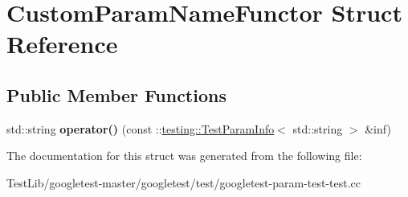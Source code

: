 \hypertarget{structCustomParamNameFunctor}{}\section{Custom\+Param\+Name\+Functor Struct Reference}
\label{structCustomParamNameFunctor}
\subsection*{Public Member Functions}
\begin{DoxyCompactItemize}
\item 
\mbox{\label{structCustomParamNameFunctor_a364d073efd6cb9a05e9d1c97565288ef}} 
std\+::string {\bfseries operator()} (const \+::\hyperlink{structtesting_1_1TestParamInfo}{testing\+::\+Test\+Param\+Info}$<$ std\+::string $>$ \&inf)
\end{DoxyCompactItemize}


The documentation for this struct was generated from the following file\+:\begin{DoxyCompactItemize}
\item 
Test\+Lib/googletest-\/master/googletest/test/googletest-\/param-\/test-\/test.\+cc\end{DoxyCompactItemize}
